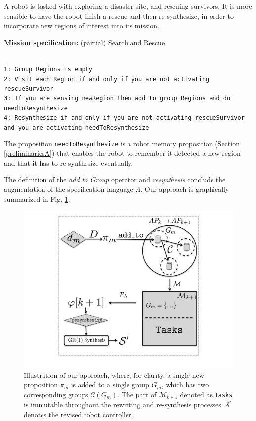 \begin{myExample}\label{Ex:SnS} A robot is tasked with exploring a disaster site, and rescuing survivors. It is more sensible to have the robot finish a rescue and then re-synthesize, in order to incorporate new regions of interest into its mission.
	\begin{algorithm}
	\textbf{Mission specification:} (partial) Search and Rescue
	
	\vspace{-6 pt}
	\hrulefill\\
	{\small
	\texttt{1: Group Regions is empty}\\
	\texttt{2: Visit each Region if and only if you are not activating rescueSurvivor}\\
	\texttt{3: If you are sensing newRegion then add to group Regions and do needToResynthesize}\\	
	\texttt{4: Resynthesize if and only if you are not activating rescueSurvivor and you are activating needToResynthesize}\\
	}
	\vspace{-10 pt}
	\end{algorithm}
	
The proposition \texttt{needToResynthesize} is a robot memory proposition (Section \ref{preliminariesA}) that enables the robot to remember it detected a new region and that it has to re-synthesize eventually.
\end{myExample}

The definition of the \emph{add to Group} operator and \emph{resynthesis} conclude the augmentation of the specification language $\Lambda$. Our approach is graphically summarized in Fig. \ref{Fig:approach}.

\begin{figure}[h]
	\centering
	\includegraphics[width=0.9\columnwidth, clip]{./img/approach.pdf}
	\caption{Illustration of our approach, where, for clarity, a single new proposition $\pi_{m}$ is added to a single group $G_m$, which has two corresponding groups $\mathcal{C}(G_m)$. The part of $\mathcal{M}_{k+1}$ denoted as \texttt{Tasks} is immutable throughout the rewriting and re-synthesis processes. $\mathcal{S}^\prime$ denotes the revised robot controller.} %
	\label{Fig:approach}
\end{figure}
